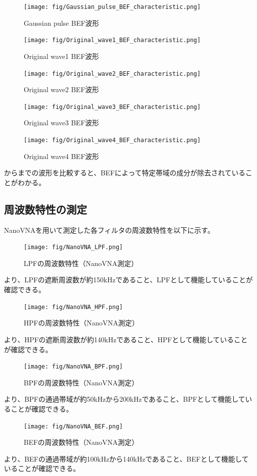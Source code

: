 \documentclass[11pt,dvipdfmx]{jarticle}
\begin{document}
\begin{figure}[H]
  \centering
  \texttt{[image: fig/Gaussian\_pulse\_BEF\_characteristic.png]}
  \caption{Gaussian pulse BEF波形}
  \label{fig:Gaussian_pulse_BEF}
\end{figure}
\begin{figure}[H]
  \centering
  \texttt{[image: fig/Original\_wave1\_BEF\_characteristic.png]}
  \caption{Original wave1 BEF波形}
  \label{fig:Original_wave1_BEF}
\end{figure}
\begin{figure}[H]
  \centering
  \texttt{[image: fig/Original\_wave2\_BEF\_characteristic.png]}
  \caption{Original wave2 BEF波形}
  \label{fig:Original_wave2_BEF}
\end{figure}
\begin{figure}[H]
  \centering
  \texttt{[image: fig/Original\_wave3\_BEF\_characteristic.png]}
  \caption{Original wave3 BEF波形}
  \label{fig:Original_wave3_BEF}
\end{figure}
\begin{figure}[H]
  \centering
  \texttt{[image: fig/Original\_wave4\_BEF\_characteristic.png]}
  \caption{Original wave4 BEF波形}
  \label{fig:Original_wave4_BEF}
\end{figure}
からまでの波形を比較すると、BEFによって特定帯域の成分が除去されていることがわかる。
\subsection{周波数特性の測定}
NanoVNAを用いて測定した各フィルタの周波数特性を以下に示す。
\begin{figure}[H]
  \centering
  \texttt{[image: fig/NanoVNA\_LPF.png]}
  \caption{LPFの周波数特性（NanoVNA測定）}
  \label{fig:NanoVNA_LPF}
\end{figure}
より、LPFの遮断周波数が約150kHzであること、LPFとして機能していることが確認できる。
\begin{figure}[H]
  \centering
  \texttt{[image: fig/NanoVNA\_HPF.png]}
  \caption{HPFの周波数特性（NanoVNA測定）}
  \label{fig:NanoVNA_HPF}
\end{figure}
より、HPFの遮断周波数が約140kHzであること、HPFとして機能していることが確認できる。
\begin{figure}[H]
  \centering
  \texttt{[image: fig/NanoVNA\_BPF.png]}
  \caption{BPFの周波数特性（NanoVNA測定）}
  \label{fig:NanoVNA_BPF}
\end{figure}
より、BPFの通過帯域が約50kHzから200kHzであること、BPFとして機能していることが確認できる。
\begin{figure}[H]
  \centering
  \texttt{[image: fig/NanoVNA\_BEF.png]}
  \caption{BEFの周波数特性（NanoVNA測定）}
  \label{fig:NanoVNA_BEF}
\end{figure}
より、BEFの通過帯域が約100kHzから140kHzであること、BEFとして機能していることが確認できる。
\end{document}
